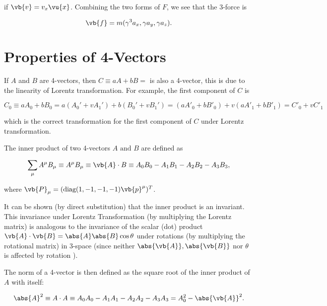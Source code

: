 \documentclass[english,a4paper,12pt]{report}
\begin{document}
if \(\vb{v} = v_{x}\vu{x}  \). Combining the two forms of \(F\), we see that the 3-force is

\begin{equation}
    \vb{f} = m(\gamma ^3 a_{x}, \gamma a_{y}, \gamma a_{z}).
\end{equation}

\section{Properties of 4-Vectors}

If \(A\) and \(B\) are 4-vectors, then \(C \equiv aA + bB = \) is also a 4-vector, this is due to the linearity of Lorentz transformation. For example, the first component of \(C\) is

\begin{equation}
    C_0 \equiv aA_0 + bB_0  = a(A_0 ' + v A_1 ') + b(B_0 ' + vB_1 ') = (aA'_{0} + b B'_{0}) + v(aA'_{1} + bB'_{1}  ) = C'_{0} + vC'_{1}  
\end{equation}

which is the correct transformation for the first component of \(C\) under Lorentz transformation.

The inner product of two 4-vectors \(A \text { and } B\) are defined as 

\begin{equation}
    \sum_{\mu} A ^{\mu }B _{\mu } \equiv A ^{\mu } B _{\mu}  \equiv  \vb{A}  \cdot B  \equiv A_0 B_0 - A_1 B_1  - A_2 B_2 - A_3 B_3,
\end{equation}

where \(\vb{P} _{\mu } = (\text{diag}(1,-1,-1,-1) \vb{p} ^{\mu }  )^T \).  

It can be shown (by direct substitution) that the inner product is an invariant. This invariance under Lorentz Transformation (by multiplying the Lorentz matrix) is analogous to the invariance of the scalar (dot) product \(\vb{A} \cdot \vb{B} = \abs{A}\abs{B}\cos \theta   \) under rotations (by multiplying the rotational matrix) in 3-space (since neither \(\abs{\vb{A} }, \abs{\vb{B} }   \) nor \(\theta \) is affected by rotation ). 

The norm of a 4-vector is then defined as the square root of the inner product of \(A\) with itself:

\begin{equation}
    \abs{A}^2 \equiv A \cdot A \equiv A_0 A_0 - A_1 A_1 -A_2 A_2 -A_3 A_3  = A_0 ^2 - \abs{\vb{A} }^2.  
\end{equation}
\end{document}
